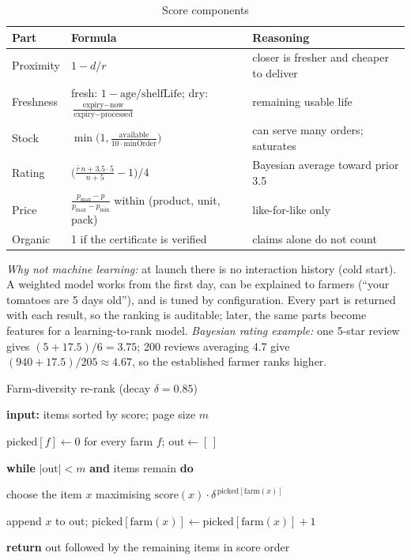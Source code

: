 \documentclass[manuscript,screen,review]{acmart}
\newcounter{pseudoline}
\newenvironment{pseudo}{\small\begin{list}{\scriptsize\arabic{pseudoline}}{\usecounter{pseudoline}\setlength{\itemsep}{1pt}\setlength{\topsep}{3pt}\setlength{\parsep}{0pt}\setlength{\leftmargin}{7mm}}}{\end{list}}
\newcommand{\kw}[1]{\textbf{#1}}
\newcommand{\ind}{\hspace*{5mm}}
\begin{document}
\begin{table}[htbp]
  \caption{Score components}
  \label{tab:score}
  \small
  \begin{tabularx}{\columnwidth}{@{}p{}p{}L@{}}
    \toprule
    \textbf{Part} & \textbf{Formula} & \textbf{Reasoning} \\
    \midrule
    Proximity & $1 - d/r$ & closer is fresher and cheaper to deliver \\
    Freshness & fresh: $1 - \text{age}/\text{shelfLife}$; dry: $\frac{\text{expiry}-\text{now}}{\text{expiry}-\text{processed}}$ & remaining usable life \\
    Stock & $\min\!\big(1, \frac{\text{available}}{10\cdot\text{minOrder}}\big)$ & can serve many orders; saturates \\
    Rating & $\big(\frac{\bar r\,n + 3.5\cdot 5}{n + 5} - 1\big)/4$ & Bayesian average toward prior 3.5 \\
    Price & $\frac{p_{\max} - p}{p_{\max} - p_{\min}}$ within (product, unit, pack) & like-for-like only \\
    Organic & 1 if the certificate is verified & claims alone do not count \\
    \bottomrule
  \end{tabularx}
\end{table}

\noindent \emph{Why not machine learning:} at launch there is no interaction history (cold start). A weighted model works from the first day, can be explained to farmers (``your tomatoes are 5 days old''), and is tuned by configuration. Every part is returned with each result, so the ranking is auditable; later, the same parts become features for a learning-to-rank model. \emph{Bayesian rating example:} one 5-star review gives $(5 + 17.5)/6 = 3.75$; 200 reviews averaging 4.7 give $(940 + 17.5)/205 \approx 4.67$, so the established farmer ranks higher.

\begin{algorithm}[H]
\caption{Farm-diversity re-rank (decay $\delta = 0.85$)}
\label{alg:diversity}
\begin{pseudo}
  \item \kw{input:} items sorted by score; page size $m$
  \item $\text{picked}[f] \gets 0$ for every farm $f$; $\text{out} \gets [\,]$
  \item \kw{while} $|\text{out}| < m$ \kw{and} items remain \kw{do}
  \item \ind choose the item $x$ maximising $\text{score}(x)\cdot\delta^{\,\text{picked}[\text{farm}(x)]}$
  \item \ind append $x$ to out; $\text{picked}[\text{farm}(x)] \gets \text{picked}[\text{farm}(x)] + 1$
  \item \kw{return} out followed by the remaining items in score order
\end{pseudo}
\end{algorithm}
\end{document}
